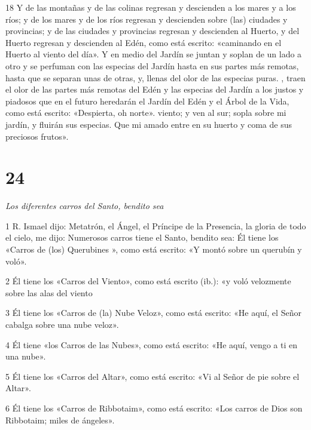\par 18 Y de las montañas y de las colinas regresan y descienden a los mares y a los ríos; y de los mares y de los ríos regresan y descienden sobre (las) ciudades y provincias; y de las ciudades y provincias regresan y descienden al Huerto, y del Huerto regresan y descienden al Edén, como está escrito: «caminando en el Huerto al viento del día». Y en medio del Jardín se juntan y soplan de un lado a otro y se perfuman con las especias del Jardín hasta en sus partes más remotas, hasta que se separan unas de otras, y, llenas del olor de las especias puras. , traen el olor de las partes más remotas del Edén y las especias del Jardín a los justos y piadosos que en el futuro heredarán el Jardín del Edén y el Árbol de la Vida, como está escrito: «Despierta, oh norte». viento; y ven al sur; sopla sobre mi jardín, y fluirán sus especias. Que mi amado entre en su huerto y coma de sus preciosos frutos».

\chapter{24}

\par \textit{Los diferentes carros del Santo, bendito sea}

\par 1 R. Ismael dijo: Metatrón, el Ángel, el Príncipe de la Presencia, la gloria de todo el cielo, me dijo: Numerosos carros tiene el Santo, bendito sea: Él tiene los «Carros de (los) Querubines », como está escrito: «Y montó sobre un querubín y voló».

\par 2 Él tiene los «Carros del Viento», como está escrito (ib.): «y voló velozmente sobre las alas del viento

\par 3 Él tiene los «Carros de (la) Nube Veloz», como está escrito: «He aquí, el Señor cabalga sobre una nube veloz».

\par 4 Él tiene «los Carros de las Nubes», como está escrito: «He aquí, vengo a ti en una nube».

\par 5 Él tiene los «Carros del Altar», como está escrito: «Vi al Señor de pie sobre el Altar».

\par 6 Él tiene los «Carros de Ribbotaim», como está escrito: «Los carros de Dios son Ribbotaim; miles de ángeles».

